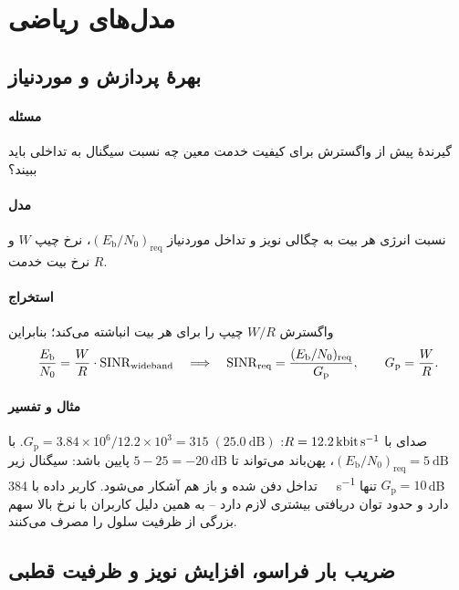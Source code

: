 \documentclass[11pt,a4paper]{article}
\begin{document}
\section{مدل‌های ریاضی}

\subsection{بهرهٔ پردازش و  موردنیاز}\label{sec:pg}
\paragraph{مسئله} گیرندهٔ  پیش از واگسترش برای کیفیت خدمت معین چه نسبت سیگنال به
تداخلی باید ببیند؟
\paragraph{مدل} نسبت انرژی هر بیت به چگالی نویز و تداخل موردنیاز
$(E_\mathrm{b}/N_0)_{\mathrm{req}}$، نرخ چیپ $W$ و نرخ بیت خدمت $R$.
\paragraph{استخراج} واگسترش $W/R$ چیپ را برای هر بیت انباشته می‌کند؛ بنابراین
\begin{equation}\label{eq:ebno}
  \frac{E_\mathrm{b}}{N_0} = \frac{W}{R}\cdot\mathrm{SINR}_{\mathrm{wideband}}
  \quad\Longrightarrow\quad
  \mathrm{SINR}_{\mathrm{req}} = \frac{(E_\mathrm{b}/N_0)_{\mathrm{req}}}{G_\mathrm{p}}, \qquad G_\mathrm{p} = \frac{W}{R}.
\end{equation}
\paragraph{مثال و تفسیر} صدای  با $R = \qty{12.2}{\kilo\bit\per\second}$:
$G_\mathrm{p} = 3.84\times10^6/12.2\times10^3 = 315 \;(\qty{25.0}{\dB})$. با
$(E_\mathrm{b}/N_0)_{\mathrm{req}} = \qty{5}{\dB}$،  پهن‌باند می‌تواند تا
$5-25 = \qty{-20}{\dB}$ پایین باشد: سیگنال  زیر تداخل دفن شده و باز هم آشکار می‌شود.
کاربر داده با \qty{384}{\kilo\bit\per\second} تنها $G_\mathrm{p} = 10$\,dB دارد و حدود 
توان دریافتی بیشتری لازم دارد -- به همین دلیل کاربران با نرخ بالا سهم بزرگی از ظرفیت سلول را مصرف
می‌کنند.

\subsection{ضریب بار فراسو، افزایش نویز و ظرفیت قطبی}\label{sec:load}
\end{document}
